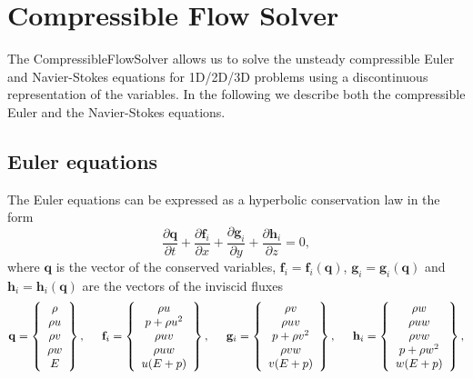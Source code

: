 \section{Compressible Flow Solver}

The CompressibleFlowSolver allows us to solve
the unsteady compressible Euler and Navier-Stokes 
equations for 1D/2D/3D problems using a discontinuous 
representation of the variables. In the following we describe 
both the compressible Euler and the Navier-Stokes equations.

\subsection{Euler equations}
The Euler equations can be expressed as a hyperbolic 
conservation law in the form 
\begin{equation}
\frac{\partial \mathbf{q} }{\partial t} + \frac{\partial \mathbf{f}_i}{\partial x} 
+ \frac{\partial \mathbf{g}_i}{\partial y} +  
\frac{\partial \mathbf{h}_i}{\partial z} = 0,
\end{equation}
where $\mathbf{q} $ is the vector of the conserved variables, 
$\mathbf{f}_i =  \mathbf{f}_i (\mathbf{q})$, $\mathbf{g}_i 
= \mathbf{g}_i (\mathbf{q})$ and $\mathbf{h}_i = 
\mathbf{h}_i (\mathbf{q})$ are  the vectors of the 
inviscid fluxes
\begin{equation}
\mathbf{q} =\left\{
\begin{array}{c}
\rho \\
\rho u \\
\rho v \\ 
\rho w \\
E
\end{array} \right\}, \hspace{0.5 cm}
\mathbf{f}_i =\left\{
\begin{array}{c}
\rho u \\
p + \rho u^2 \\
\rho u v \\ 
\rho u w \\
u (E + p)
\end{array} \right\}, \hspace{0.5 cm}
\mathbf{g}_i =\left\{
\begin{array}{c}
\rho v \\
\rho u v \\
p + \rho v^2 \\ 
\rho v w \\
v (E + p)
\end{array} \right\}, \hspace{0.5 cm}
\mathbf{h}_i =\left\{
\begin{array}{c}
\rho w \\
\rho u w \\
\rho v w \\ 
p + \rho w^2 \\
w (E + p)
\end{array} \right\},
\label{Euler}
\end{equation}
